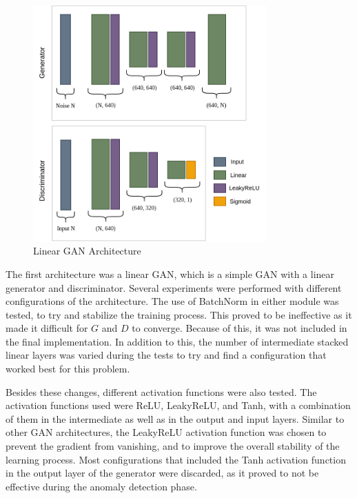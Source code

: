 \begin{figure}
    \centering
    \includegraphics[width=0.8\textwidth]{figures/linearGAN.png}
    \caption{Linear GAN Architecture}
    \label{fig:linear_gan_architecture}
\end{figure}


The first architecture was a linear GAN, which is a simple GAN with a linear generator and discriminator. Several experiments were performed with different configurations of the architecture. The use of BatchNorm in either module was tested, to try and stabilize the training process. This proved to be ineffective as it made it difficult for $G$ and $D$ to converge. Because of this, it was not included in the final implementation. In addition to this, the number of intermediate stacked linear layers was varied during the tests to try and find a configuration that worked best for this problem. 

Besides these changes, different activation functions were also tested. The activation functions used were ReLU, LeakyReLU, and Tanh, with a combination of them in the intermediate as well as in the output and input layers. Similar to other GAN architectures, the LeakyReLU activation function was chosen to prevent the gradient from vanishing, and to improve the overall stability of the learning process. Most configurations that included the Tanh activation function in the output layer of the generator were discarded, as it proved to not be effective during the anomaly detection phase.

